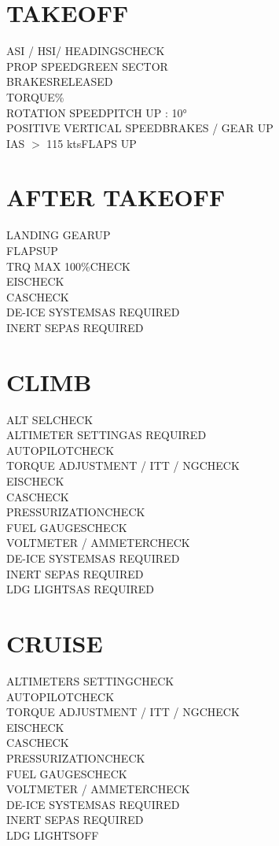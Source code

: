 \documentclass{article}
\begin{document}
\begin{multicols*}{2}
\section*{TAKEOFF}
ASI / HSI/ HEADINGS\dotfill CHECK\\
PROP SPEED\dotfill GREEN SECTOR\\
BRAKES\dotfill RELEASED\\
TORQUE\%\\
ROTATION SPEED\dotfill PITCH UP : 10°\\
POSITIVE VERTICAL SPEED\dotfill BRAKES / GEAR UP\\
IAS $>$ 115 kts\dotfill FLAPS UP
\section*{AFTER TAKEOFF}
LANDING GEAR\dotfill UP\\
FLAPS\dotfill UP\\
TRQ MAX 100\%\dotfill CHECK\\
EIS\dotfill CHECK\\
CAS\dotfill CHECK\\
DE-ICE SYSTEMS\dotfill AS REQUIRED\\
INERT SEP\dotfill AS REQUIRED
\vfill\null
\section*{CLIMB}
ALT SEL\dotfill CHECK\\
ALTIMETER SETTING\dotfill AS REQUIRED\\
AUTOPILOT\dotfill CHECK\\
TORQUE ADJUSTMENT / ITT / NG\dotfill CHECK\\
EIS\dotfill CHECK\\
CAS\dotfill CHECK\\
PRESSURIZATION\dotfill CHECK\\
FUEL GAUGES\dotfill CHECK\\
VOLTMETER / AMMETER\dotfill CHECK\\
DE-ICE SYSTEMS\dotfill AS REQUIRED\\
INERT SEP\dotfill AS REQUIRED\\
LDG LIGHTS\dotfill AS REQUIRED
\section*{CRUISE}
ALTIMETERS SETTING\dotfill CHECK\\
AUTOPILOT\dotfill CHECK\\
TORQUE ADJUSTMENT / ITT / NG\dotfill CHECK\\
EIS\dotfill CHECK\\
CAS\dotfill CHECK\\
PRESSURIZATION\dotfill CHECK\\
FUEL GAUGES\dotfill CHECK\\
VOLTMETER / AMMETER\dotfill CHECK\\
DE-ICE SYSTEMS\dotfill AS REQUIRED\\
INERT SEP\dotfill AS REQUIRED\\
LDG LIGHTS\dotfill OFF

\end{multicols*}
\end{document}
